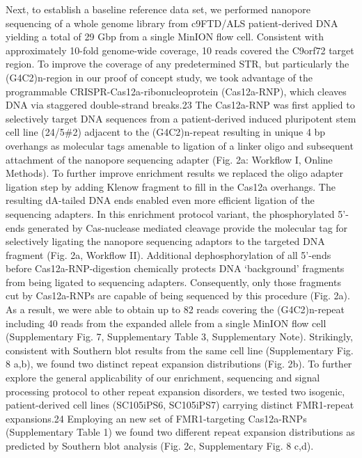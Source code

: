 Next, to establish a baseline reference data set, we performed nanopore sequencing of a whole genome library from c9FTD/ALS patient-derived DNA yielding a total of 29 Gbp from a single MinION flow cell. Consistent with approximately 10-fold genome-wide coverage, 10 reads covered the C9orf72 target region. To improve the coverage of any predetermined STR, but particularly the (G4C2)n-region in our proof of concept study, we took advantage of the programmable CRISPR-Cas12a-ribonucleoprotein (Cas12a-RNP), which cleaves DNA via staggered double-strand breaks.23 The Cas12a-RNP was first applied to selectively target DNA sequences from a patient-derived induced pluripotent stem cell line (24/5\#2) adjacent to the (G4C2)n-repeat resulting in unique 4 bp overhangs as molecular tags amenable to ligation of a linker oligo and subsequent attachment of the nanopore sequencing adapter (Fig. 2a: Workflow I, Online Methods). To further improve enrichment results we replaced the oligo adapter ligation step by adding Klenow fragment to fill in the Cas12a overhangs. The resulting dA-tailed DNA ends enabled even more efficient ligation of the sequencing adapters. In this enrichment protocol variant, the phosphorylated 5’-ends generated by Cas-nuclease mediated cleavage provide the molecular tag for selectively ligating the nanopore sequencing adaptors to the targeted DNA fragment (Fig. 2a, Workflow II).
Additional dephosphorylation of all 5’-ends before Cas12a-RNP-digestion chemically protects DNA ‘background’ fragments from being ligated to sequencing adapters. Consequently, only those fragments cut by Cas12a-RNPs are capable of being sequenced by this procedure (Fig. 2a). As a result, we were able to obtain up to 82 reads covering the (G4C2)n-repeat including 40 reads from the expanded allele from a single MinION flow cell (Supplementary Fig. 7, Supplementary Table 3, Supplementary Note). Strikingly, consistent with Southern blot results from the same cell line (Supplementary Fig. 8 a,b), we found two distinct repeat expansion distributions (Fig. 2b). To further explore the general applicability of our enrichment, sequencing and signal processing protocol to other repeat expansion disorders, we tested two isogenic, patient-derived cell lines (SC105iPS6, SC105iPS7) carrying distinct FMR1-repeat expansions.24 Employing an new set of FMR1-targeting Cas12a-RNPs (Supplementary Table 1) we found two different repeat expansion distributions as predicted by Southern blot analysis (Fig. 2c, Supplementary Fig. 8 c,d).
